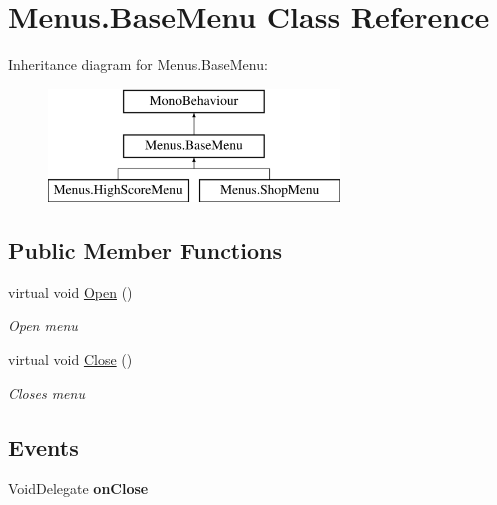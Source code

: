 \hypertarget{class_menus_1_1_base_menu}{}\section{Menus.\+Base\+Menu Class Reference}
\label{class_menus_1_1_base_menu}
Inheritance diagram for Menus.\+Base\+Menu\+:\begin{figure}[H]
\begin{center}
\leavevmode
\includegraphics[height=3.000000cm]{class_menus_1_1_base_menu}
\end{center}
\end{figure}
\subsection*{Public Member Functions}
\begin{DoxyCompactItemize}
\item 
virtual void \hyperlink{class_menus_1_1_base_menu_aedf5a0abb1c46b9687cba0f216734176}{Open} ()
\begin{DoxyCompactList}\small\item\em Open menu \end{DoxyCompactList}\item 
virtual void \hyperlink{class_menus_1_1_base_menu_a9d4fb5bab4fd1c5288774cc4e1e341af}{Close} ()
\begin{DoxyCompactList}\small\item\em Closes menu \end{DoxyCompactList}\end{DoxyCompactItemize}
\subsection*{Events}
\begin{DoxyCompactItemize}
\item 
Void\+Delegate {\bfseries on\+Close}\hypertarget{class_menus_1_1_base_menu_ab6f7e2c71bb9dc828964269ebbf93685}{}\label{class_menus_1_1_base_menu_ab6f7e2c71bb9dc828964269ebbf93685}

\end{DoxyCompactItemize}


